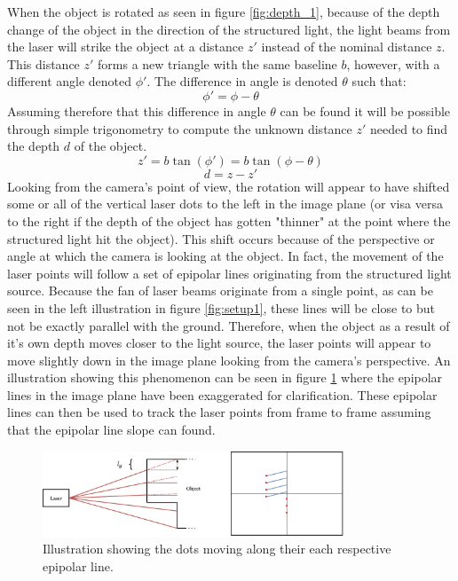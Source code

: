 When the object is rotated as seen in figure \ref{fig:depth_1}, because of the depth change of the object in the direction of the structured light, the light beams from the laser will strike the object at a distance $z'$ instead of the nominal distance $z$. This distance $z'$ forms a new triangle with the same baseline $b$, however, with a different angle denoted $\phi'$. The difference in angle is denoted $\theta$ such that:
\begin{equation}
\label{eq:phi'}
    \phi' = \phi - \theta
\end{equation}
Assuming therefore that this difference in angle $\theta$ can be found it will be possible through simple trigonometry to compute the unknown distance $z'$ needed to find the depth $d$ of the object.
\begin{equation}
\label{eq:z'}
    z' = b \tan(\phi') = b \tan(\phi - \theta)
\end{equation}
\begin{equation}
\label{eq:d}
    d = z - z'
\end{equation}
Looking from the camera's point of view, the rotation will appear to have shifted some or all of the vertical laser dots to the left in the image plane (or visa versa to the right if the depth of the object has gotten "thinner" at the point where the structured light hit the object). This shift occurs because of the perspective or angle at which the camera is looking at the object. In fact, the movement of the laser points will follow a set of epipolar lines originating from the structured light source. Because the fan of laser beams originate from a single point, as can be seen in the left illustration in figure \ref{fig:setup1}, these lines will be close to but not be exactly parallel with the ground. Therefore, when the object as a result of it's own depth moves closer to the light source, the laser points will appear to move slightly down in the image plane looking from the camera's perspective. An illustration showing this phenomenon can be seen in figure \ref{fig:ly} where the epipolar lines in the image plane have been exaggerated for clarification. These epipolar lines can then be used to track the laser points from frame to frame assuming that the epipolar line slope can found.\\   

\begin{figure}[h]
    \centering
    \includegraphics[width=0.8\textwidth]{figures/reconstruction/ly.pdf}
    \caption{Illustration showing the dots moving along their each respective epipolar line.}
    \label{fig:ly}
\end{figure}

